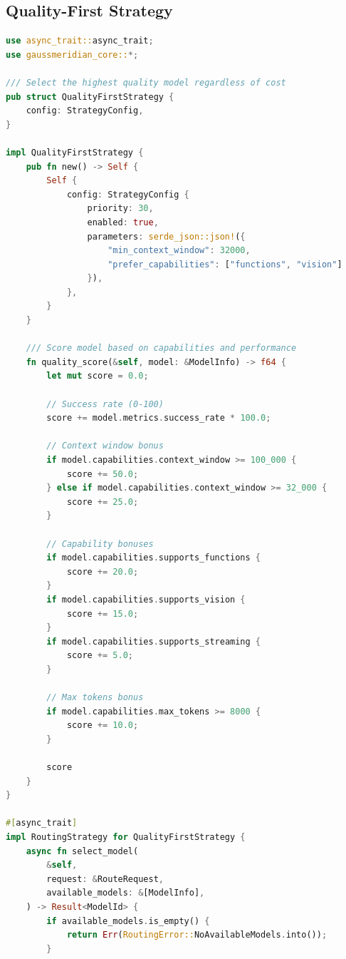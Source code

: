 \documentclass[12pt,a4paper,twoside]{report}
\begin{document}
\subsection{Quality-First Strategy}

\begin{lstlisting}[language=Rust,caption={Quality-First Routing - crates/gaussmeridian-router/src/strategies/quality.rs}]
use async_trait::async_trait;
use gaussmeridian_core::*;

/// Select the highest quality model regardless of cost
pub struct QualityFirstStrategy {
    config: StrategyConfig,
}

impl QualityFirstStrategy {
    pub fn new() -> Self {
        Self {
            config: StrategyConfig {
                priority: 30,
                enabled: true,
                parameters: serde_json::json!({
                    "min_context_window": 32000,
                    "prefer_capabilities": ["functions", "vision"]
                }),
            },
        }
    }
    
    /// Score model based on capabilities and performance
    fn quality_score(&self, model: &ModelInfo) -> f64 {
        let mut score = 0.0;
        
        // Success rate (0-100)
        score += model.metrics.success_rate * 100.0;
        
        // Context window bonus
        if model.capabilities.context_window >= 100_000 {
            score += 50.0;
        } else if model.capabilities.context_window >= 32_000 {
            score += 25.0;
        }
        
        // Capability bonuses
        if model.capabilities.supports_functions {
            score += 20.0;
        }
        if model.capabilities.supports_vision {
            score += 15.0;
        }
        if model.capabilities.supports_streaming {
            score += 5.0;
        }
        
        // Max tokens bonus
        if model.capabilities.max_tokens >= 8000 {
            score += 10.0;
        }
        
        score
    }
}

#[async_trait]
impl RoutingStrategy for QualityFirstStrategy {
    async fn select_model(
        &self,
        request: &RouteRequest,
        available_models: &[ModelInfo],
    ) -> Result<ModelId> {
        if available_models.is_empty() {
            return Err(RoutingError::NoAvailableModels.into());
        }
        

\end{lstlisting}
\end{document}
